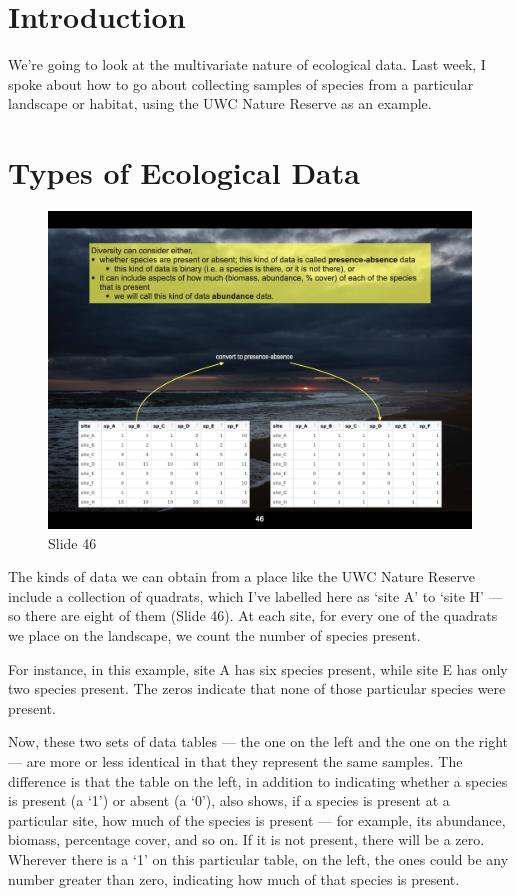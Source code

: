 \documentclass[
  11pt,
]{book}
\begin{document}
\section{Introduction}\label{introduction}

We're going to look at the multivariate nature of ecological data. Last
week, I spoke about how to go about collecting samples of species from a
particular landscape or habitat, using the UWC Nature Reserve as an
example.

\section{Types of Ecological Data}\label{types-of-ecological-data}

\begin{figure}[ht]
\centering
\includegraphics[width=0.8\linewidth]{../images/BDC334/BDC334-046.jpeg}
\caption*{Slide 46}
\end{figure}

The kinds of data we can obtain from a place like the UWC Nature Reserve
include a collection of quadrats, which I've labelled here as `site A'
to `site H' --- so there are eight of them (Slide 46). At each site, for
every one of the quadrats we place on the landscape, we count the number
of species present.

For instance, in this example, site A has six species present, while
site E has only two species present. The zeros indicate that none of
those particular species were present.

Now, these two sets of data tables --- the one on the left and the one
on the right --- are more or less identical in that they represent the
same samples. The difference is that the table on the left, in addition
to indicating whether a species is present (a `1') or absent (a `0'),
also shows, if a species is present at a particular site, how much of
the species is present --- for example, its abundance, biomass,
percentage cover, and so on. If it is not present, there will be a zero.
Wherever there is a `1' on this particular table, on the left, the ones
could be any number greater than zero, indicating how much of that
species is present.
\end{document}
